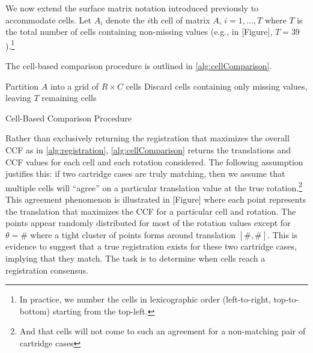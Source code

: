 \documentclass[
]{jdssv}
\begin{document}
We now extend the surface matrix notation introduced previously to
accommodate cells. Let \(A_{i}\) denote the \(i\)th cell of matrix
\(A\), \(i = 1,...,T\) where \(T\) is the total number of cells
containing non-missing values (e.g., in {[}Figure{]},
\(T = 39\)).\footnote{In practice, we number the cells in lexicographic order (left-to-right, top-to-bottom) starting from the top-left.}

The cell-based comparison procedure is outlined in
\autoref{alg:cellComparison}.

\begin{algorithm}[H]
 Partition $A$ into a grid of $R \times C$ cells\;
 Discard cells containing only missing values, leaving $T$ remaining cells\;
 \caption{Cell-Based Comparison Procedure}
 \label{alg:cellComparison}
\end{algorithm}

Rather than exclusively returning the registration that maximizes the
overall CCF as in \autoref{alg:registration},
\autoref{alg:cellComparison} returns the translations and CCF values for
each cell and each rotation considered. The following assumption
justifies this: if two cartridge cases are truly matching, then we
assume that multiple cells will ``agree'' on a particular translation
value at the true
rotation.\footnote{And that cells will not come to such an agreement for a non-matching pair of cartridge cases}
This agreement phenomenon is illustrated in {[}Figure{]} where each
point represents the translation that maximizes the CCF for a particular
cell and rotation. The points appear randomly distributed for most of
the rotation values except for \(\theta = \#\) where a tight cluster of
points forms around translation \([\#,\#]\). This is evidence to suggest
that a true registration exists for these two cartridge cases, implying
that they match. The task is to determine when cells reach a
registration consensus.
\end{document}
